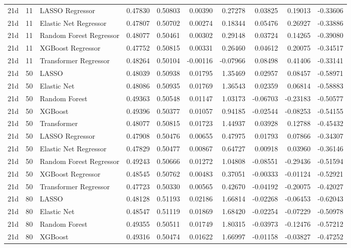 \begin{tabular}{lllrrrrrrr}
21d & 11 & LASSO Regressor & 0.47830 & 0.50803 & 0.00390 & 0.27278 & 0.03825 & 0.19013 & -0.33606 \\
21d & 11 & Elastic Net Regressor & 0.47807 & 0.50702 & 0.00274 & 0.18344 & 0.05476 & 0.26927 & -0.33886 \\
21d & 11 & Random Forest Regressor & 0.48077 & 0.50461 & 0.00302 & 0.29148 & 0.03724 & 0.14265 & -0.39080 \\
21d & 11 & XGBoost Regressor & 0.47752 & 0.50815 & 0.00331 & 0.26460 & 0.04612 & 0.20075 & -0.34517 \\
21d & 11 & Transformer Regressor & 0.48264 & 0.50104 & -0.00116 & -0.07966 & 0.08498 & 0.41406 & -0.33141 \\
21d & 50 & LASSO & 0.48039 & 0.50938 & 0.01795 & 1.35469 & 0.02957 & 0.08457 & -0.58971 \\
21d & 50 & Elastic Net & 0.48086 & 0.50935 & 0.01769 & 1.36543 & 0.02359 & 0.06814 & -0.58883 \\
21d & 50 & Random Forest & 0.49363 & 0.50548 & 0.01147 & 1.03173 & -0.06703 & -0.23183 & -0.50577 \\
21d & 50 & XGBoost & 0.49396 & 0.50377 & 0.01057 & 0.94185 & -0.02544 & -0.08253 & -0.54155 \\
21d & 50 & Transformer & 0.48077 & 0.50815 & 0.01723 & 1.44937 & 0.03928 & 0.12788 & -0.45432 \\
21d & 50 & LASSO Regressor & 0.47908 & 0.50476 & 0.00655 & 0.47975 & 0.01793 & 0.07866 & -0.34307 \\
21d & 50 & Elastic Net Regressor & 0.47829 & 0.50477 & 0.00867 & 0.64727 & 0.00918 & 0.03960 & -0.36146 \\
21d & 50 & Random Forest Regressor & 0.49243 & 0.50666 & 0.01272 & 1.04808 & -0.08551 & -0.29436 & -0.51594 \\
21d & 50 & XGBoost Regressor & 0.48545 & 0.50762 & 0.00483 & 0.37051 & -0.00333 & -0.01124 & -0.52921 \\
21d & 50 & Transformer Regressor & 0.47723 & 0.50330 & 0.00565 & 0.42670 & -0.04192 & -0.20075 & -0.42027 \\
21d & 80 & LASSO & 0.48128 & 0.51193 & 0.02186 & 1.66814 & -0.02268 & -0.06453 & -0.62043 \\
21d & 80 & Elastic Net & 0.48547 & 0.51119 & 0.01869 & 1.68420 & -0.02254 & -0.07229 & -0.50978 \\
21d & 80 & Random Forest & 0.49355 & 0.50511 & 0.01749 & 1.80315 & -0.03973 & -0.12476 & -0.57212 \\
21d & 80 & XGBoost & 0.49316 & 0.50474 & 0.01622 & 1.66997 & -0.01158 & -0.03827 & -0.47252 \\

\end{tabular}
